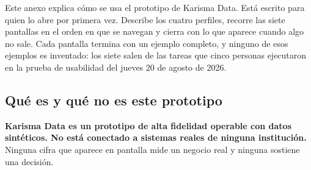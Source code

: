 %
%
%
%

\label{sec:a5-manual}

Este anexo explica cómo se usa el prototipo de Karisma Data. Está escrito para quien lo abre por
primera vez. Describe los cuatro perfiles, recorre las siete pantallas en el orden en que se
navegan y cierra con lo que aparece cuando algo no sale. Cada pantalla termina con un ejemplo
completo, y ninguno de esos ejemplos es inventado: los siete salen de las tareas que cinco
personas ejecutaron en la prueba de usabilidad del jueves 20 de agosto de 2026.

\subsection{Qué es y qué no es este prototipo}

\begin{uxdestacado}
\textbf{Karisma Data es un prototipo de alta fidelidad operable con datos sintéticos. No está
conectado a sistemas reales de ninguna institución.} Ninguna cifra que aparece en pantalla mide
un negocio real y ninguna sostiene una decisión.
\end{uxdestacado}

